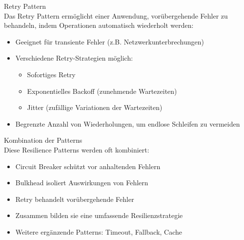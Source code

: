 \begin{definition}{Retry Pattern}\\
    Das Retry Pattern ermöglicht einer Anwendung, vorübergehende Fehler zu behandeln, indem Operationen automatisch wiederholt werden:
    \begin{itemize}
        \item Geeignet für transiente Fehler (z.B. Netzwerkunterbrechungen)
        \item Verschiedene Retry-Strategien möglich:
        \begin{itemize}
            \item Sofortiges Retry
            \item Exponentielles Backoff (zunehmende Wartezeiten)
            \item Jitter (zufällige Variationen der Wartezeiten)
        \end{itemize}
        \item Begrenzte Anzahl von Wiederholungen, um endlose Schleifen zu vermeiden
    \end{itemize}
\end{definition}

\begin{concept}{Kombination der Patterns}\\
    Diese Resilience Patterns werden oft kombiniert:
    \begin{itemize}
        \item Circuit Breaker schützt vor anhaltenden Fehlern
        \item Bulkhead isoliert Auswirkungen von Fehlern
        \item Retry behandelt vorübergehende Fehler
        \item Zusammen bilden sie eine umfassende Resilienzstrategie
        \item Weitere ergänzende Patterns: Timeout, Fallback, Cache
    \end{itemize}
\end{concept}

